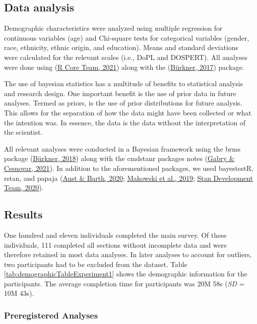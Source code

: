\documentclass[
  donotrepeattitle,doc, 12pt, a4paper,floatsintext]{apa7}
\begin{document}
\hypertarget{data-analysis}{%
\subsection{Data analysis}\label{data-analysis}}

Demographic characteristics were analyzed using multiple regression for continuous variables (age) and Chi-square tests for categorical variables (gender, race, ethnicity, ethnic origin, and education). Means and standard deviations were calculated for the relevant scales (i.e., DoPL and DOSPERT). All analyses were done using (\protect\hyperlink{ref-rcoreteam2021}{R Core Team, 2021}) along with the (\protect\hyperlink{ref-burkner2017}{Bürkner, 2017}) package.

The use of bayesian statistics has a multitude of benefits to statistical analysis and research design. One important benefit is the use of prior data in future analyses. Termed as priors, is the use of prior distributions for future analysis. This allows for the separation of how the data might have been collected or what the intention was. In essence, the data is the data without the interpretation of the scientist.

All relevant analyses were conducted in a Bayesian framework using the brms package (\protect\hyperlink{ref-burkner2018}{Bürkner, 2018}) along with the cmdstanr packages notes (\protect\hyperlink{ref-gabry2021}{Gabry \& Cesnovar, 2021}). In addition to the aforementioned packages, we used bayestestR, rstan, and papaja (\protect\hyperlink{ref-aust2020}{Aust \& Barth, 2020}; \protect\hyperlink{ref-makowski2019}{Makowski et al., 2019}; \protect\hyperlink{ref-standevelopmentteam2020}{Stan Development Team, 2020}).

\hypertarget{results}{%
\subsection{Results}\label{results}}

One hundred and eleven individuals completed the main survey. Of these individuals, 111 completed all sections without incomplete data and were therefore retained in most data analyses. In later analyses to account for outliers, two participants had to be excluded from the dataset. Table \ref{tab:demographicTableExperiment1} shows the demographic information for the participants. The average completion time for participants was 20M 58s (\emph{SD} = 10M 43s).

\hypertarget{preregistered-analyses}{%
\subsubsection{Preregistered Analyses}\label{preregistered-analyses}}
\end{document}
